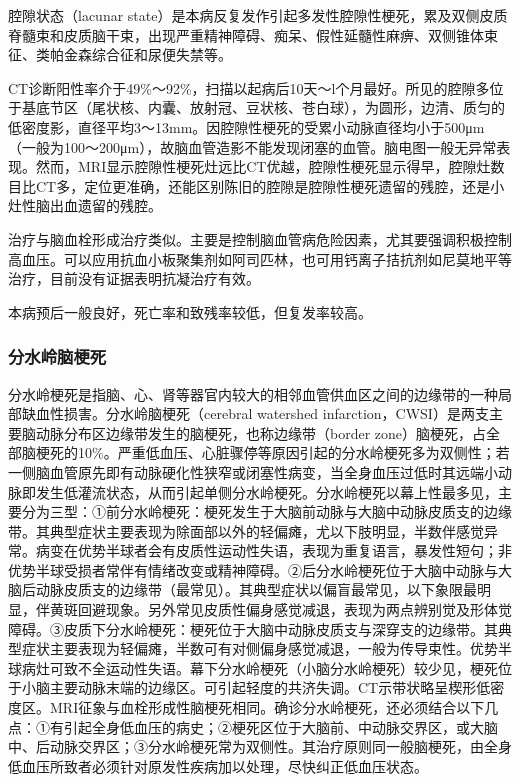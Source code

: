 腔隙状态（lacunar
state）是本病反复发作引起多发性腔隙性梗死，累及双侧皮质脊髓束和皮质脑干束，出现严重精神障碍、痴呆、假性延髓性麻痹、双侧锥体束征、类帕金森综合征和尿便失禁等。

CT诊断阳性率介于49\%～92\%，扫描以起病后10天～l个月最好。所见的腔隙多位于基底节区（尾状核、内囊、放射冠、豆状核、苍白球），为圆形，边清、质匀的低密度影，直径平均3～13mm。因腔隙性梗死的受累小动脉直径均小于500μm（一般为100～200μm），故脑血管造影不能发现闭塞的血管。脑电图一般无异常表现。然而，MRI显示腔隙性梗死灶远比CT优越，腔隙性梗死显示得早，腔隙灶数目比CT多，定位更准确，还能区别陈旧的腔隙是腔隙性梗死遗留的残腔，还是小灶性脑出血遗留的残腔。

治疗与脑血栓形成治疗类似。主要是控制脑血管病危险因素，尤其要强调积极控制高血压。可以应用抗血小板聚集剂如阿司匹林，也可用钙离子拮抗剂如尼莫地平等治疗，目前没有证据表明抗凝治疗有效。

本病预后一般良好，死亡率和致残率较低，但复发率较高。

\subsubsection{分水岭脑梗死}

分水岭梗死是指脑、心、肾等器官内较大的相邻血管供血区之间的边缘带的一种局部缺血性损害。分水岭脑梗死（cerebral
watershed
infarction，CWSI）是两支主要脑动脉分布区边缘带发生的脑梗死，也称边缘带（border
zone）脑梗死，占全部脑梗死的10\%。严重低血压、心脏骤停等原因引起的分水岭梗死多为双侧性；若一侧脑血管原先即有动脉硬化性狭窄或闭塞性病变，当全身血压过低时其远端小动脉即发生低灌流状态，从而引起单侧分水岭梗死。分水岭梗死以幕上性最多见，主要分为三型：①前分水岭梗死：梗死发生于大脑前动脉与大脑中动脉皮质支的边缘带。其典型症状主要表现为除面部以外的轻偏瘫，尤以下肢明显，半数伴感觉异常。病变在优势半球者会有皮质性运动性失语，表现为重复语言，暴发性短句；非优势半球受损者常伴有情绪改变或精神障碍。②后分水岭梗死位于大脑中动脉与大脑后动脉皮质支的边缘带（最常见）。其典型症状以偏盲最常见，以下象限最明显，伴黄斑回避现象。另外常见皮质性偏身感觉减退，表现为两点辨别觉及形体觉障碍。③皮质下分水岭梗死：梗死位于大脑中动脉皮质支与深穿支的边缘带。其典型症状主要表现为轻偏瘫，半数可有对侧偏身感觉减退，一般为传导束性。优势半球病灶可致不全运动性失语。幕下分水岭梗死（小脑分水岭梗死）较少见，梗死位于小脑主要动脉末端的边缘区。可引起轻度的共济失调。CT示带状略呈楔形低密度区。MRI征象与血栓形成性脑梗死相同。确诊分水岭梗死，还必须结合以下几点：①有引起全身低血压的病史；②梗死区位于大脑前、中动脉交界区，或大脑中、后动脉交界区；③分水岭梗死常为双侧性。其治疗原则同一般脑梗死，由全身低血压所致者必须针对原发性疾病加以处理，尽快纠正低血压状态。

